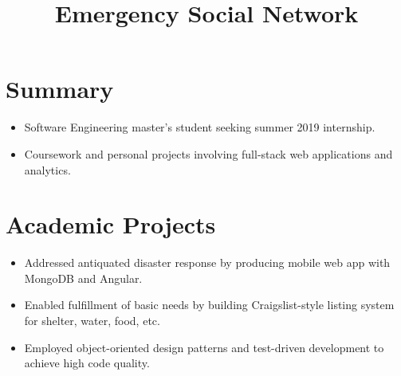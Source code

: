 \documentclass[12pt]{res} %
\begin{document}
    \begin{resume}
 
      \section{Summary}
      \begin{itemize}[leftmargin=-0.4cm, rightmargin=0.8cm]
        \itemsep0em
        \item Software Engineering master's student seeking summer 2019 internship.
        \item Coursework and personal projects involving full-stack web applications and analytics.
        \end{itemize}
        \vspace{-10pt}
      
        \section{Academic Projects}
          \vspace{2pt}

          \title{\textbf{Emergency Social Network}}
          \begin{position}
            \vspace{-14pt}
            \begin{itemize}[leftmargin=-0.4cm, rightmargin=0.8cm]
            \itemsep0em
            \item Addressed antiquated disaster response by producing mobile web app with MongoDB and Angular.
            \item Enabled fulfillment of basic needs by building Craigslist-style listing system for shelter, water, food, etc.
            \item Employed object-oriented design patterns and test-driven development to achieve high code quality.
            \end{itemize}
          \end{position}
          \vspace{-10pt}


\end{resume}
\end{document}
